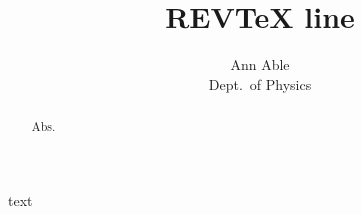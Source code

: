 \documentclass[aps,prl]{revtex4-2}
\begin{document}
\title{REVTeX line}
\author{Ann Able\\ Dept.\ of Physics}
\begin{abstract}Abs.\end{abstract}
\maketitle
text
\end{document}
